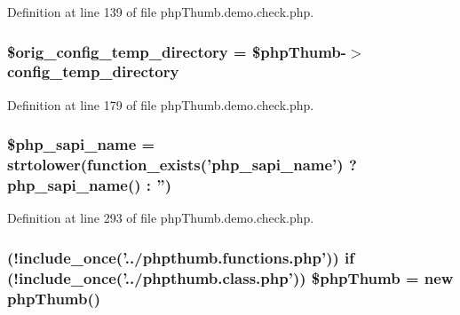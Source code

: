 \-Definition at line 139 of file php\-Thumb.\-demo.\-check.\-php.

\hypertarget{php_thumb_8demo_8check_8php_a3d1766c9eb410f75e62121bf57cc7942}{
\subsubsection[{\$orig\-\_\-config\-\_\-temp\-\_\-directory}]{\setlength{\rightskip}{0pt plus 5cm}\$orig\-\_\-config\-\_\-temp\-\_\-directory = \$php\-Thumb-\/$>$config\-\_\-temp\-\_\-directory}}\label{php_thumb_8demo_8check_8php_a3d1766c9eb410f75e62121bf57cc7942}


\-Definition at line 179 of file php\-Thumb.\-demo.\-check.\-php.

\hypertarget{php_thumb_8demo_8check_8php_ad475c14b05e96964a42b4c3859f4aff4}{
\subsubsection[{\$php\-\_\-sapi\-\_\-name}]{\setlength{\rightskip}{0pt plus 5cm}\$php\-\_\-sapi\-\_\-name = strtolower(function\-\_\-exists('php\-\_\-sapi\-\_\-name') ? php\-\_\-sapi\-\_\-name() \-: '')}}\label{php_thumb_8demo_8check_8php_ad475c14b05e96964a42b4c3859f4aff4}


\-Definition at line 293 of file php\-Thumb.\-demo.\-check.\-php.

\hypertarget{php_thumb_8demo_8check_8php_aa255ed2e2f11993a251707f14a754498}{
\subsubsection[{\$php\-Thumb}]{ (!include\-\_\-once('../phpthumb.\-functions.\-php')) {\bf if} (!include\-\_\-once('../phpthumb.\-class.\-php')) \$php\-Thumb = new php\-Thumb()}}\label{php_thumb_8demo_8check_8php_aa255ed2e2f11993a251707f14a754498}


